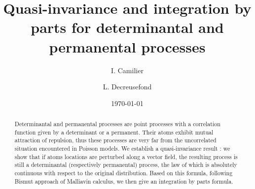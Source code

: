 \documentclass[11pt,a4paper]{amsart}
\author{I. Camilier}
\author{L. Decreusefond}
\title[Quasi-invariance of determinantal processes]{Quasi-invariance
  and integration by parts  for determinantal and permanental processes}
\date{\today}
\begin{document}
 

  

\begin{abstract}
  Determinantal and permanental processes are point processes with a
  correlation function given by a determinant or a permanent. Their
  atoms exhibit mutual attraction of repulsion, thus these processes
  are very far from the uncorrelated situation encountered in Poisson
  models. We establish a quasi-invariance result : we show that if
  atoms locations are perturbed along a vector field, the resulting
  process is still a determinantal (respectively permanental) process,
  the law of which is absolutely continuous with respect to the
  original distribution. Based on this formula, following Bismut
  approach of Malliavin calculus, we then give an integration by parts
  formula.
\end{abstract}
\maketitle
\end{document}
